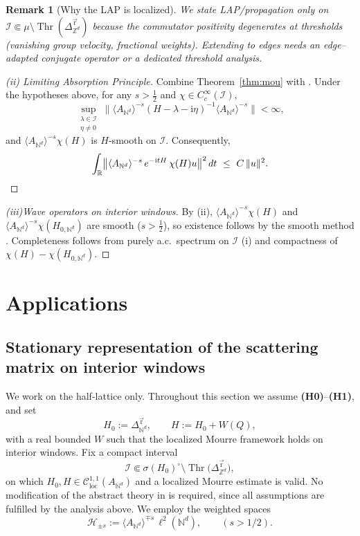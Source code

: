 \documentclass[10pt]{amsart}
\newcommand{\R}{{\mathbb{R}}}
\newcommand{\Z}{{\mathbb{Z}}}
\newcommand{\N}{{\mathbb{N}}}
\newcommand{\1}{{\mathbb{I}}}
\newcommand{\Cc}{\mathcal{C}}
\newcommand{\Hc}{\mathcal{H}}
\newcommand{\Ic}{\mathcal{I}}
\newcommand{\Thr}{\operatorname{Thr}}
\numberwithin{equation}{section}
\newtheorem{remark}[theorem]{Remark}%
\begin{document}
\begin{remark}[Why the LAP is localized]
We state LAP/propagation only on $\Ic\Subset \mu\setminus\Thr(\Delta_{\Z^d}^{\vec{\mathrm{r}}})$ because the commutator positivity degenerates at thresholds (vanishing group velocity, fractional weights). Extending to edges needs an edge--adapted conjugate operator or a dedicated threshold analysis.
\end{remark}



\begin{proof}[(ii) Limiting Absorption Principle]
Combine Theorem~\ref{thm:mou} with \cite[Theorems.~7.4.1--7.5.1]{ABG}.
Under the hypotheses above, for any $s>\tfrac12$ and $\chi\in C_c^\infty(\Ic)$,
\[
\sup_{\substack{\lambda\in \Ic\\ \eta\neq 0}}
\big\|\langle A_{\N^d}\rangle^{-s}(H-\lambda-\mathrm i\eta)^{-1}\langle A_{\N^d}\rangle^{-s}\big\|<\infty,
\]
and $\langle A_{\N^d}\rangle^{-s}\chi(H)$ is $H$-smooth on $\Ic$. Consequently,
\[
\int_{\R}\bigl\|\langle A_{\N^d}\rangle^{-s}\,e^{-{\rm i}tH}\,\chi(H)u\bigr\|^2\,dt\ \le\ C\,\|u\|^2.
\]
\end{proof}


\begin{proof}[(iii)Wave operators on interior windows]
By (ii), $\langle A_{\N^d}\rangle^{-s}\chi(H)$ and $\langle A_{\N^d}\rangle^{-s}\chi(H_{0,\N^d})$ are smooth ($s>\tfrac12$), so existence follows by the smooth method \cite[Section 7.7]{ABG}. Completeness follows from purely a.c.\ spectrum on $\Ic$ (i) and compactness of $\chi(H)-\chi(H_{0,\N^d})$.
\end{proof}


\section{Applications}\label{sec:applications}

\subsection{Stationary representation of the scattering matrix on interior windows}
\label{subsec:stationary-S}
We work on the half-lattice only. Throughout this section we assume \textbf{(H0)}--\textbf{(H1)}, and set
\[
H_{0}:=\Delta^{\vec{\mathrm{r}}}_{\N^d},\qquad H:=H_{0}+W(Q),
\]
with a real bounded $W$ such that the localized Mourre framework holds on interior windows.
Fix a compact interval
\[
\Ic\Subset \sigma(H_{0})^\circ\setminus \Thr\!\big(\Delta_{\Z^d}^{\vec{\mathrm{r}}}\big),
\]
on which $H_{0},H\in\Cc^{1,1}_{\mathrm{loc}}(A_{\N^d})$ and a localized Mourre estimate is valid.
No modification of the abstract theory in \cite{ABG} is required, since all assumptions are fulfilled by the analysis above.
We employ the weighted spaces
\[
\Hc_{\pm s}:=\langle A_{\N^d}\rangle^{\mp s}\,\ell^2(\N^d), \qquad (s>1/2).
\]
\end{document}
